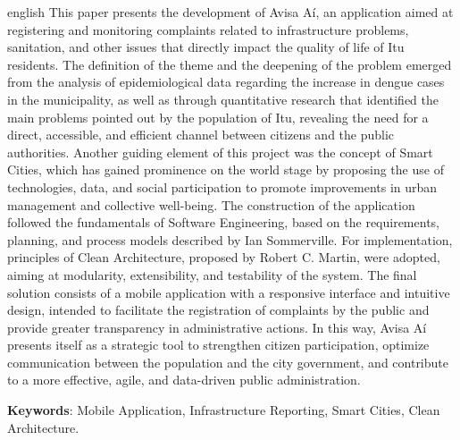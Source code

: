 \begin{resumo}[Abstract]
    \begin{otherlanguage*}{english}
    \SingleSpacing
        This paper presents the development of Avisa Aí, an application aimed at registering and monitoring complaints related to infrastructure problems, sanitation, and other issues that directly impact the quality of life of Itu residents. The definition of the theme and the deepening of the problem emerged from the analysis of epidemiological data regarding the increase in dengue cases in the municipality, as well as through quantitative research that identified the main problems pointed out by the population of Itu, revealing the need for a direct, accessible, and efficient channel between citizens and the public authorities. Another guiding element of this project was the concept of Smart Cities, which has gained prominence on the world stage by proposing the use of technologies, data, and social participation to promote improvements in urban management and collective well-being. The construction of the application followed the fundamentals of Software Engineering, based on the requirements, planning, and process models described by Ian Sommerville. For implementation, principles of Clean Architecture, proposed by Robert C. Martin, were adopted, aiming at modularity, extensibility, and testability of the system. The final solution consists of a mobile application with a responsive interface and intuitive design, intended to facilitate the registration of complaints by the public and provide greater transparency in administrative actions. In this way, Avisa Aí presents itself as a strategic tool to strengthen citizen participation, optimize communication between the population and the city government, and contribute to a more effective, agile, and data-driven public administration.

        \vspace{\onelineskip}

        \noindent 
        \textbf{Keywords}: Mobile Application, Infrastructure Reporting, Smart Cities, Clean Architecture.
    \end{otherlanguage*}
\end{resumo}